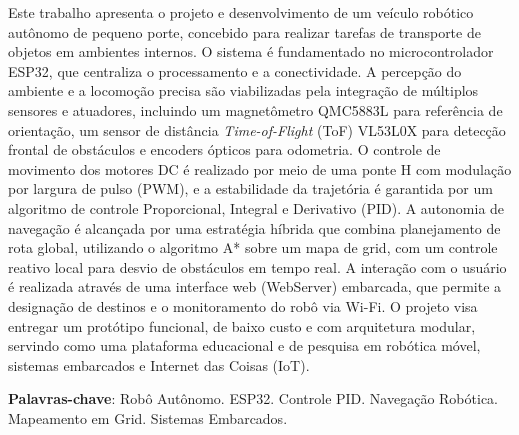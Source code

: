 \documentclass[	12pt, Times, openright, twoside, a4paper, english, brazil]{abntex2}
\begin{document}
\begin{resumo}
	Este trabalho apresenta o projeto e desenvolvimento de um veículo robótico autônomo de pequeno porte, concebido para realizar tarefas de transporte de objetos em ambientes internos. O sistema é fundamentado no microcontrolador ESP32, que centraliza o processamento e a conectividade. A percepção do ambiente e a locomoção precisa são viabilizadas pela integração de múltiplos sensores e atuadores, incluindo um magnetômetro QMC5883L para referência de orientação, um sensor de distância \textit{Time-of-Flight} (ToF) VL53L0X para detecção frontal de obstáculos e encoders ópticos para odometria. O controle de movimento dos motores DC é realizado por meio de uma ponte H com modulação por largura de pulso (PWM), e a estabilidade da trajetória é garantida por um algoritmo de controle Proporcional, Integral e Derivativo (PID). A autonomia de navegação é alcançada por uma estratégia híbrida que combina planejamento de rota global, utilizando o algoritmo A* sobre um mapa de grid, com um controle reativo local para desvio de obstáculos em tempo real. A interação com o usuário é realizada através de uma interface web (WebServer) embarcada, que permite a designação de destinos e o monitoramento do robô via Wi-Fi. O projeto visa entregar um protótipo funcional, de baixo custo e com arquitetura modular, servindo como uma plataforma educacional e de pesquisa em robótica móvel, sistemas embarcados e Internet das Coisas (IoT).
	\vspace{\onelineskip}

	\noindent
	\textbf{Palavras-chave}: Robô Autônomo. ESP32. Controle PID. Navegação Robótica. Mapeamento em Grid. Sistemas Embarcados.
\end{resumo}
\end{document}

